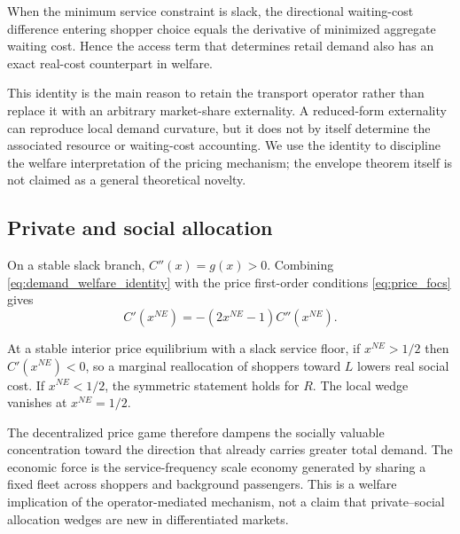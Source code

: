 \begin{proposition}\label{prop:envelope}
When the minimum service constraint is slack, the directional waiting-cost difference entering shopper choice equals the derivative of minimized aggregate waiting cost. Hence the access term that determines retail demand also has an exact real-cost counterpart in welfare.
\end{proposition}

This identity is the main reason to retain the transport operator rather than replace it with an arbitrary market-share externality. A reduced-form externality can reproduce local demand curvature, but it does not by itself determine the associated resource or waiting-cost accounting. We use the identity to discipline the welfare interpretation of the pricing mechanism; the envelope theorem itself is not claimed as a general theoretical novelty.

\subsection{Private and social allocation}

On a stable slack branch, $C''(x)=g(x)>0$. Combining \eqref{eq:demand_welfare_identity} with the price first-order conditions \eqref{eq:price_focs} gives
\begin{equation}
C'(x^{NE})=-(2x^{NE}-1)C''(x^{NE}).
\label{eq:welfare_wedge}
\end{equation}

\begin{proposition}\label{prop:welfare_wedge}
At a stable interior price equilibrium with a slack service floor, if $x^{NE}>1/2$ then $C'(x^{NE})<0$, so a marginal reallocation of shoppers toward $L$ lowers real social cost. If $x^{NE}<1/2$, the symmetric statement holds for $R$. The local wedge vanishes at $x^{NE}=1/2$.
\end{proposition}

The decentralized price game therefore dampens the socially valuable concentration toward the direction that already carries greater total demand. The economic force is the service-frequency scale economy generated by sharing a fixed fleet across shoppers and background passengers. This is a welfare implication of the operator-mediated mechanism, not a claim that private--social allocation wedges are new in differentiated markets.

